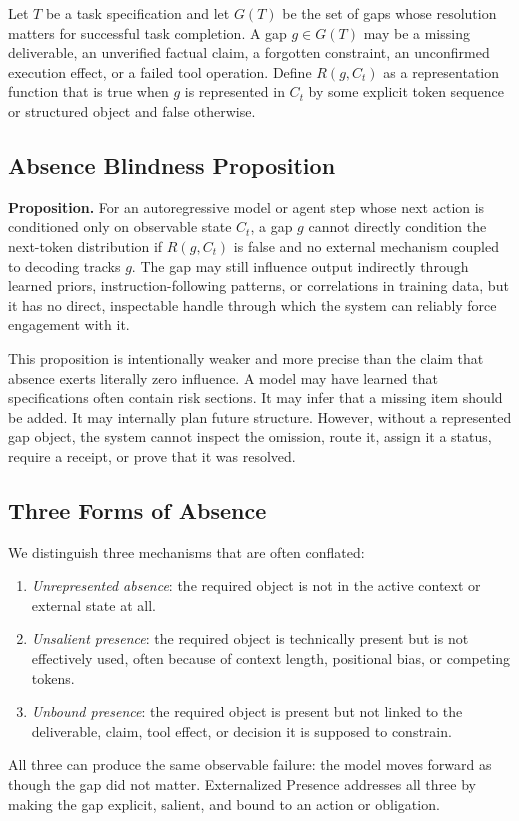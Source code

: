 \documentclass[10pt,conference]{IEEEtran}
\begin{document}
Let $T$ be a task specification and let $G(T)$ be the set of gaps whose resolution matters for successful task completion. A gap $g \in G(T)$ may be a missing deliverable, an unverified factual claim, a forgotten constraint, an unconfirmed execution effect, or a failed tool operation. Define $R(g,C_t)$ as a representation function that is true when $g$ is represented in $C_t$ by some explicit token sequence or structured object and false otherwise.

\subsection{Absence Blindness Proposition}
\textbf{Proposition.} For an autoregressive model or agent step whose next action is conditioned only on observable state $C_t$, a gap $g$ cannot directly condition the next-token distribution if $R(g,C_t)$ is false and no external mechanism coupled to decoding tracks $g$. The gap may still influence output indirectly through learned priors, instruction-following patterns, or correlations in training data, but it has no direct, inspectable handle through which the system can reliably force engagement with it.

This proposition is intentionally weaker and more precise than the claim that absence exerts literally zero influence. A model may have learned that specifications often contain risk sections. It may infer that a missing item should be added. It may internally plan future structure. However, without a represented gap object, the system cannot inspect the omission, route it, assign it a status, require a receipt, or prove that it was resolved.

\subsection{Three Forms of Absence}
We distinguish three mechanisms that are often conflated:
\begin{enumerate}
\item \emph{Unrepresented absence}: the required object is not in the active context or external state at all.
\item \emph{Unsalient presence}: the required object is technically present but is not effectively used, often because of context length, positional bias, or competing tokens.
\item \emph{Unbound presence}: the required object is present but not linked to the deliverable, claim, tool effect, or decision it is supposed to constrain.
\end{enumerate}
All three can produce the same observable failure: the model moves forward as though the gap did not matter. Externalized Presence addresses all three by making the gap explicit, salient, and bound to an action or obligation.
\end{document}
